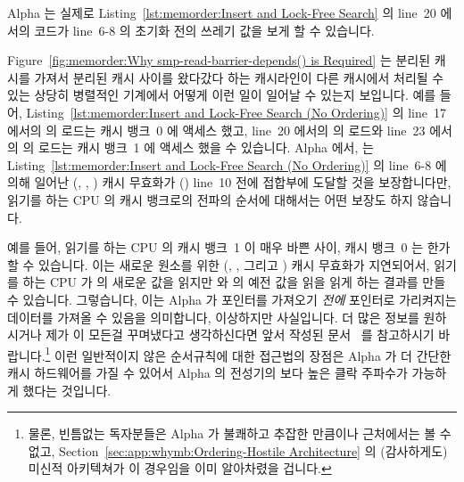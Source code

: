 Alpha 는 실제로
Listing~\ref{lst:memorder:Insert and Lock-Free Search} 의 line~20 에서의 코드가
line~6-8 의 초기화 전의 쓰레기 값을 보게 할 수 있습니다.

Figure~\ref{fig:memorder:Why smp-read-barrier-depends() is Required}
는 분리된 캐시를 가져서 분리된 캐시 사이를 왔다갔다 하는 캐시라인이 다른
캐시에서 처리될 수 있는 상당히 병렬적인 기계에서 어떻게 이런 일이 일어날 수
있는지 보입니다.
예를 들어,
Listing~\ref{lst:memorder:Insert and Lock-Free Search (No Ordering)}
의 line~17 에서의  의 로드는 캐시 뱅크~0 에 액세스 했고, line~20
에서의  의 로드와 line~23 에서의  의 로드는 캐시 뱅크~1
에 액세스 했을 수 있습니다.
Alpha 에서,  는
Listing~\ref{lst:memorder:Insert and Lock-Free Search (No Ordering)} 의
line~6-8 에 의해 일어난 (, , ) 캐시 무효화가
() line~10 전에 접합부에 도달할 것을 보장합니다만, 읽기를 하는
CPU 의 캐시 뱅크로의 전파의 순서에 대해서는 어떤 보장도 하지 않습니다.

예를 들어, 읽기를 하는 CPU 의 캐시 뱅크~1 이 매우 바쁜 사이, 캐시 뱅크~0 는
한가할 수 있습니다.
이는 새로운 원소를 위한 (, , 그리고 ) 캐시
무효화가 지연되어서, 읽기를 하는 CPU 가  의 새로운 값을 읽지만
 와  의 예전 값을 읽을 읽게 하는 결과를 만들 수
있습니다.
그렇습니다, 이는 Alpha 가 포인터를 가져오기 {\em 전에} 포인터로 가리켜지는
데이터를 가져올 수 있음을 의미합니다, 이상하지만 사실입니다.
더 많은 정보를 원하시거나 제가 이 모든걸 꾸며냈다고 생각하신다면 앞서 작성된
문서~\cite{Compaq01,WilliamPugh2000Gharachorloo} 를 참고하시기
바랍니다.\footnote{
	물론, 빈틈없는 독자분들은 Alpha 가 불쾌하고 추잡한 만큼이나 근처에서는
	볼 수 없고, Section~\ref{sec:app:whymb:Ordering-Hostile Architecture}
	의 (감사하게도) 미신적 아키텍쳐가 이 경우임을 이미 알아차렸을 겁니다.}
이런 일반적이지 않은 순서규칙에 대한 접근법의 장점은 Alpha 가 더 간단한 캐시
하드웨어를 가질 수 있어서 Alpha 의 전성기의 보다 높은 클락 주파수가 가능하게
했다는 것입니다.
\iffalse

